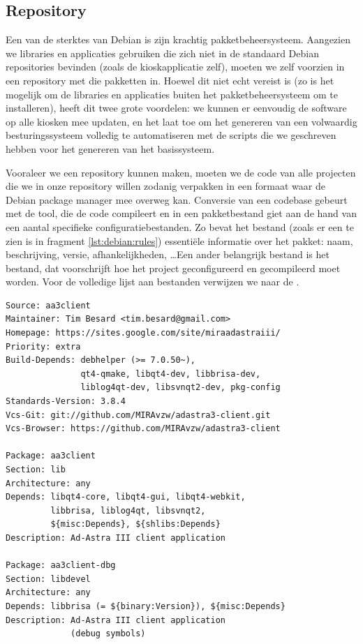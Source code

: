 \subsection{Repository}
\label{kiosk:deployment:besturingssysteem:repository}

Een van de sterktes van Debian is zijn krachtig pakketbeheersysteem. Aangezien we libraries en applicaties gebruiken die zich niet in de standaard Debian repositories bevinden (zoals de kioskapplicatie zelf), moeten we zelf voorzien in een repository met die pakketten in. Hoewel dit niet echt vereist is (zo is het mogelijk om de libraries en applicaties buiten het pakketbeheersysteem om te installeren), heeft dit twee grote voordelen: we kunnen er eenvoudig de software op alle kiosken mee updaten, en het laat toe om het genereren van een volwaardig besturingssysteem volledig te automatiseren met de scripts die we geschreven hebben voor het genereren van het basissysteem.

Vooraleer we een repository kunnen maken, moeten we de code van alle projecten die we in onze repository willen zodanig verpakken in een formaat waar de Debian package manager mee overweg kan. Conversie van een codebase gebeurt met de  tool, die de code compileert en in een pakketbestand giet aan de hand van een aantal specifieke configuratiebestanden. Zo bevat het  bestand (zoals er een te zien is in fragment \ref{lst:debian:rules}) essentiële informatie over het pakket: naam, beschrijving, versie, afhankelijkheden, \ldots Een ander belangrijk bestand is het  bestand, dat voorschrijft hoe het project geconfigureerd en gecompileerd moet worden. Voor de volledige lijst aan bestanden verwijzen we naar de .

\begin{lstlisting}[float, caption=Debian control packaging bestand., label=lst:debian:rules]
Source: aa3client
Maintainer: Tim Besard <tim.besard@gmail.com>
Homepage: https://sites.google.com/site/miraadastraiii/
Priority: extra
Build-Depends: debhelper (>= 7.0.50~),
               qt4-qmake, libqt4-dev, libbrisa-dev,
               liblog4qt-dev, libsvnqt2-dev, pkg-config
Standards-Version: 3.8.4
Vcs-Git: git://github.com/MIRAvzw/adastra3-client.git
Vcs-Browser: https://github.com/MIRAvzw/adastra3-client

Package: aa3client
Section: lib
Architecture: any
Depends: libqt4-core, libqt4-gui, libqt4-webkit,
         libbrisa, liblog4qt, libsvnqt2,
         ${misc:Depends}, ${shlibs:Depends}
Description: Ad-Astra III client application

Package: aa3client-dbg
Section: libdevel
Architecture: any
Depends: libbrisa (= ${binary:Version}), ${misc:Depends}
Description: Ad-Astra III client application
             (debug symbols)
\end{lstlisting}

